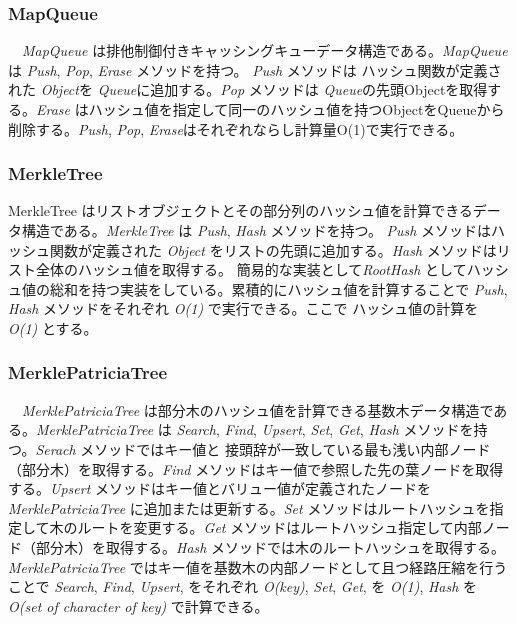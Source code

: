 \hypertarget{mapqueue}{%
\subsubsection{MapQueue}\label{mapqueue}}

　\emph{MapQueue}
は排他制御付きキャッシングキューデータ構造である。\emph{MapQueue} は
\emph{Push}, \emph{Pop}, \emph{Erase} メソッドを持つ。 \emph{Push}
メソッドは ハッシュ関数が定義された \emph{Object}を
\emph{Queue}に追加する。\emph{Pop} メソッドは
\emph{Queue}の先頭Objectを取得する。\emph{Erase}
はハッシュ値を指定して同一のハッシュ値を持つObjectをQueueから削除する。\emph{Push},
\emph{Pop}, \emph{Erase}はそれぞれならし計算量O(1)で実行できる。

\hypertarget{merkletree}{%
\subsubsection{MerkleTree}\label{merkletree}}

MerkleTree
はリストオブジェクトとその部分列のハッシュ値を計算できるデータ構造である。\emph{MerkleTree}
は \emph{Push}, \emph{Hash} メソッドを持つ。 \emph{Push}
メソッドはハッシュ関数が定義された \emph{Object}
をリストの先頭に追加する。\emph{Hash}
メソッドはリスト全体のハッシュ値を取得する。
簡易的な実装として\emph{RootHash}
としてハッシュ値の総和を持つ実装をしている。累積的にハッシュ値を計算することで
\emph{Push}, \emph{Hash} メソッドをそれぞれ \emph{O(1)}
で実行できる。ここで ハッシュ値の計算を \emph{O(1)} とする。

\hypertarget{merklepatriciatree}{%
\subsubsection{MerklePatriciaTree}\label{merklepatriciatree}}

　\emph{MerklePatriciaTree}\cite{5}
は部分木のハッシュ値を計算できる基数木データ構造である。\emph{MerklePatriciaTree}
は \emph{Search}, \emph{Find}, \emph{Upsert}, \emph{Set}, \emph{Get},
\emph{Hash} メソッドを持つ。\emph{Serach} メソッドではキー値と
接頭辞が一致している最も浅い内部ノード（部分木）を取得する。\emph{Find}
メソッドはキー値で参照した先の葉ノードを取得する。\emph{Upsert}
メソッドはキー値とバリュー値が定義されたノードを
\emph{MerklePatriciaTree} に追加または更新する。\emph{Set}
メソッドはルートハッシュを指定して木のルートを変更する。\emph{Get}
メソッドはルートハッシュ指定して内部ノード（部分木）を取得する。\emph{Hash}
メソッドでは木のルートハッシュを取得する。\emph{MerklePatriciaTree}
ではキー値を基数木の内部ノードとして且つ経路圧縮を行うことで
\emph{Search}, \emph{Find}, \emph{Upsert}, をそれぞれ
\emph{O(\textbar key\textbar)}, \emph{Set}, \emph{Get}, を \emph{O(1)},
\emph{Hash} を \emph{O(\textbar set of character of key\textbar)}
で計算できる。

